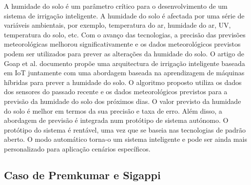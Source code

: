 \documentclass[conference]{IEEEtran}
\begin{document}
A humidade do solo é um parâmetro crítico para o desenvolvimento de um 
sistema de irrigação inteligente. A humidade do solo é afectada por uma 
série de variáveis ambientais, por exemplo, temperatura do ar, 
humidade do ar, UV, temperatura do solo, etc. Com o avanço das tecnologias, 
a precisão das previsões meteorológicas melhorou significativamente e 
os dados meteorológicos previstos podem ser utilizados para prever as 
alterações da humidade do solo. O artigo de Goap et al. documento propõe uma arquitectura 
de irrigação inteligente baseada em IoT juntamente com uma abordagem 
baseada na aprendizagem de máquinas híbridas para prever a humidade do solo. 
O algoritmo proposto utiliza os dados dos sensores do passado recente e 
os dados meteorológicos previstos para a previsão da humidade do solo 
dos próximos dias. O valor previsto da humidade do solo é melhor em 
termos da sua precisão e taxa de erro. Além disso, a abordagem de 
previsão é integrada num protótipo de sistema autónomo. O protótipo 
do sistema é rentável, uma vez que se baseia nas tecnologias de padrão aberto. 
O modo automático torna-o um sistema inteligente e pode ser ainda 
mais personalizado para aplicação cenários específicos. \cite{goap2018an}

\subsection{Caso de Premkumar e Sigappi}
\end{document}
